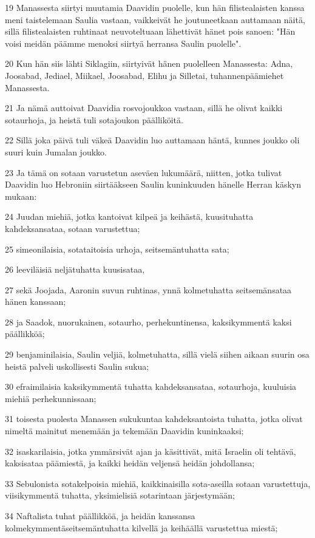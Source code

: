 \par 19 Manassesta siirtyi muutamia Daavidin puolelle, kun hän filistealaisten kanssa meni taistelemaan Saulia vastaan, vaikkeivät he joutuneetkaan auttamaan näitä, sillä filistealaisten ruhtinaat neuvoteltuaan lähettivät hänet pois sanoen: "Hän voisi meidän päämme menoksi siirtyä herransa Saulin puolelle".
\par 20 Kun hän siis lähti Siklagiin, siirtyivät hänen puolelleen Manassesta: Adna, Joosabad, Jediael, Miikael, Joosabad, Elihu ja Silletai, tuhannenpäämiehet Manassesta.
\par 21 Ja nämä auttoivat Daavidia rosvojoukkoa vastaan, sillä he olivat kaikki sotaurhoja, ja heistä tuli sotajoukon päälliköitä.
\par 22 Sillä joka päivä tuli väkeä Daavidin luo auttamaan häntä, kunnes joukko oli suuri kuin Jumalan joukko.
\par 23 Ja tämä on sotaan varustetun aseväen lukumäärä, niitten, jotka tulivat Daavidin luo Hebroniin siirtääkseen Saulin kuninkuuden hänelle Herran käskyn mukaan:
\par 24 Juudan miehiä, jotka kantoivat kilpeä ja keihästä, kuusituhatta kahdeksansataa, sotaan varustettua;
\par 25 simeonilaisia, sotataitoisia urhoja, seitsemäntuhatta sata;
\par 26 leeviläisiä neljätuhatta kuusisataa,
\par 27 sekä Joojada, Aaronin suvun ruhtinas, ynnä kolmetuhatta seitsemänsataa hänen kanssaan;
\par 28 ja Saadok, nuorukainen, sotaurho, perhekuntinensa, kaksikymmentä kaksi päällikköä;
\par 29 benjaminilaisia, Saulin veljiä, kolmetuhatta, sillä vielä siihen aikaan suurin osa heistä palveli uskollisesti Saulin sukua;
\par 30 efraimilaisia kaksikymmentä tuhatta kahdeksansataa, sotaurhoja, kuuluisia miehiä perhekunnissaan;
\par 31 toisesta puolesta Manassen sukukuntaa kahdeksantoista tuhatta, jotka olivat nimeltä mainitut menemään ja tekemään Daavidin kuninkaaksi;
\par 32 isaskarilaisia, jotka ymmärsivät ajan ja käsittivät, mitä Israelin oli tehtävä, kaksisataa päämiestä, ja kaikki heidän veljensä heidän johdollansa;
\par 33 Sebulonista sotakelpoisia miehiä, kaikkinaisilla sota-aseilla sotaan varustettuja, viisikymmentä tuhatta, yksimielisiä sotarintaan järjestymään;
\par 34 Naftalista tuhat päällikköä, ja heidän kanssansa kolmekymmentäseitsemäntuhatta kilvellä ja keihäällä varustettua miestä;
